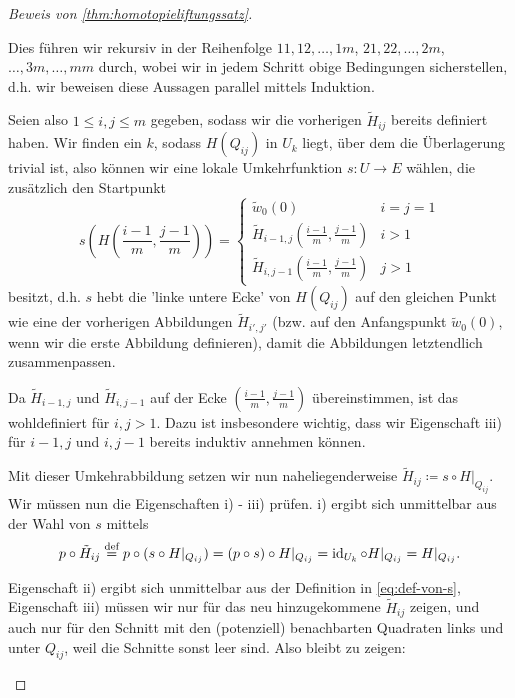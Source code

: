 \begin{proof}[Beweis von \autoref{thm:homotopieliftungssatz}]
\begin{description}
            Dies führen wir rekursiv in der Reihenfolge $11, 12, \ldots, 1m$, $21, 22, \ldots, 2m$, $\ldots, 3m, \ldots, mm$ durch, wobei wir in jedem Schritt obige Bedingungen sicherstellen, d.h. wir beweisen diese Aussagen parallel mittels Induktion.

            Seien also $1\leq i,j\leq m$ gegeben, sodass wir die vorherigen $\tilde{H}_{ij}$ bereits definiert haben. Wir finden ein $k$, sodass $H(Q_{ij})$ in $U_k$ liegt, über dem die Überlagerung trivial ist, also können wir eine lokale Umkehrfunktion  $s\colon  U \to  E$ wählen, die zusätzlich den Startpunkt
    \begin{equation}
        \label{eq:def-von-s}
        s\left(H\left( \frac{i-1}{m}, \frac{j-1}{m} \right) \right) = \begin{cases}
            \tilde{w}_0(0) & i=j=1 \\
            \tilde{H}_{i-1,j}\left( \frac{i-1}{m}, \frac{j-1}{m} \right) & i>1 \\
            \tilde{H}_{i,j-1}\left( \frac{i-1}{m}, \frac{j-1}{m} \right) & j>1
        \end{cases}
    \end{equation}
    besitzt, d.h. $s$ hebt die 'linke untere Ecke' von  $H(Q_{ij})$ auf den gleichen Punkt wie eine der vorherigen Abbildungen $\tilde{H}_{i',j'}$ (bzw. auf den Anfangspunkt $\tilde{w}_0(0)$, wenn wir die erste Abbildung definieren), damit die Abbildungen letztendlich zusammenpassen.
    \begin{remark}
        Da $\tilde{H}_{i-1,j}$ und $ \tilde{H}_{i,j-1}$ auf der Ecke $\left( \frac{i-1}{m}, \frac{j-1}{m} \right) $ übereinstimmen, ist das wohldefiniert für $i,j > 1$. Dazu ist insbesondere wichtig, dass wir Eigenschaft iii) für $i-1,j$ und  $i,j-1$ bereits induktiv annehmen können.
    \end{remark}

    Mit dieser Umkehrabbildung setzen wir nun naheliegenderweise $\tilde{H}_{ij}\coloneqq  s \circ  H|_{Q_{ij}}$. Wir müssen nun die Eigenschaften i) - iii) prüfen. i) ergibt sich unmittelbar aus der Wahl von $s$ mittels
    \[
        p \circ  \tilde{H}_{ij} \stackrel{\text{def}}{=} p \circ  (s \circ  H|_{Q_{ij}}) = (p \circ  s) \circ  H|_{Q_{ij}} = \operatorname{id}_{U_k} \circ  H|_{Q_{ij}} =  H|_{Q_{ij}}
    .\] 

    Eigenschaft ii) ergibt sich unmittelbar aus der Definition in \autoref{eq:def-von-s}, Eigenschaft iii) müssen wir nur für das neu hinzugekommene $\tilde{H}_{ij}$ zeigen, und auch nur für den Schnitt mit den (potenziell) benachbarten Quadraten links und unter $Q_{ij}$, weil die Schnitte sonst leer sind. Also bleibt zu zeigen:


\end{description}
\end{proof}
